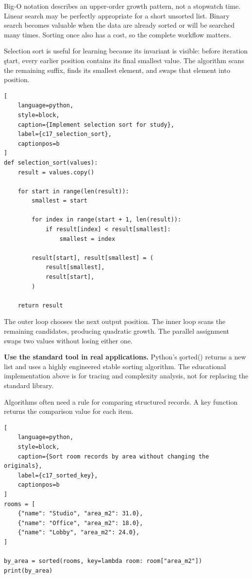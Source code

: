 Big-O notation describes an upper-order growth pattern, not a stopwatch time.
Linear search may be perfectly appropriate for a short unsorted list. Binary
search becomes valuable when the data are already sorted or will be searched
many times. Sorting once also has a cost, so the complete workflow matters.


Selection sort is useful for learning because its invariant is visible: before
iteration \c{start}, every earlier position contains its final smallest value.
The algorithm scans the remaining suffix, finds its smallest element, and swaps
that element into position.

\begin{lstlisting}[
    language=python,
    style=block,
    caption={Implement selection sort for study},
    label={c17_selection_sort},
    captionpos=b
]
def selection_sort(values):
    result = values.copy()

    for start in range(len(result)):
        smallest = start

        for index in range(start + 1, len(result)):
            if result[index] < result[smallest]:
                smallest = index

        result[start], result[smallest] = (
            result[smallest],
            result[start],
        )

    return result
\end{lstlisting}

The outer loop chooses the next output position. The inner loop scans the
remaining candidates, producing quadratic growth. The parallel assignment
swaps two values without losing either one.

\begin{NoteBox}
\textbf{Use the standard tool in real applications.} Python's \c{sorted()}
returns a new list and uses a highly engineered stable sorting algorithm. The
educational implementation above is for tracing and complexity analysis, not
for replacing the standard library.
\end{NoteBox}


Algorithms often need a rule for comparing structured records. A key function
returns the comparison value for each item.

\begin{lstlisting}[
    language=python,
    style=block,
    caption={Sort room records by area without changing the originals},
    label={c17_sorted_key},
    captionpos=b
]
rooms = [
    {"name": "Studio", "area_m2": 31.0},
    {"name": "Office", "area_m2": 18.0},
    {"name": "Lobby", "area_m2": 24.0},
]

by_area = sorted(rooms, key=lambda room: room["area_m2"])
print(by_area)
\end{lstlisting}

